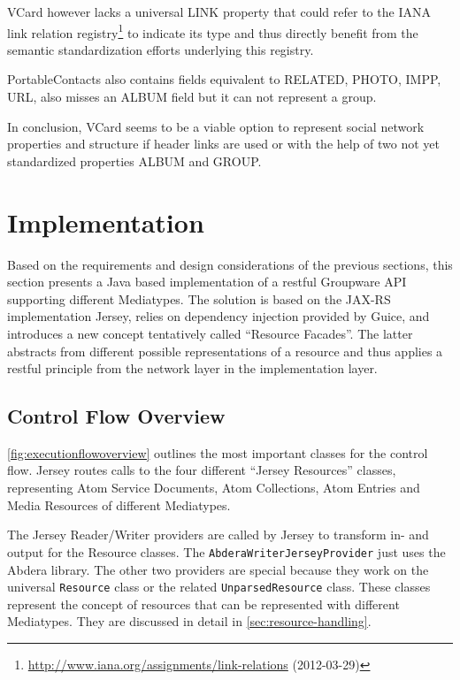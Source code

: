 \documentclass[11pt,a4paper,headsepline,twoside]{scrartcl}		%
\newcommand{\citeurl}[2]{\url{#1} (#2)}
\begin{document}
VCard however lacks a universal LINK property that could refer to the IANA link
relation
registry\footnote{\citeurl{http://www.iana.org/assignments/link-relations}{2012-03-29}}
to indicate its type and thus directly benefit from the semantic standardization
efforts underlying this registry.

PortableContacts also contains fields equivalent to RELATED, PHOTO, IMPP, URL,
also misses an ALBUM field but it can not represent a group.

In conclusion, VCard seems to be a viable option to represent social network
properties and structure if header links are used or with the help of two not
yet standardized properties ALBUM and GROUP.

\section{Implementation}
\label{sec:implementation}

Based on the requirements and design considerations of the previous sections,
this section presents a Java based implementation of a restful Groupware API
supporting different Mediatypes. The solution is based on the
JAX-RS \cite{JAX-RS1.1} implementation Jersey, relies on dependency injection
provided by Guice, and introduces a new concept tentatively called ``Resource
Facades''. The latter abstracts from different possible representations of a
resource and thus applies a restful principle from the network layer in the
implementation layer.

\subsection{Control Flow Overview}
\label{sec:overview}

\autoref{fig:executionflowoverview} outlines the most important classes for the
control flow. Jersey routes calls to the four different ``Jersey Resources''
classes, representing Atom Service Documents, Atom Collections, Atom Entries and
Media Resources of different Mediatypes.

The Jersey Reader/Writer providers are called by Jersey to transform in- and
output for the Resource classes. The \lstinline:AbderaWriterJerseyProvider: just
uses the Abdera library. The other two providers are special because they work
on the universal \lstinline:Resource: class or the related
\lstinline:UnparsedResource: class. These classes represent the concept of
resources that can be represented with different Mediatypes. They are discussed
in detail in \autoref{sec:resource-handling}.
\end{document}
